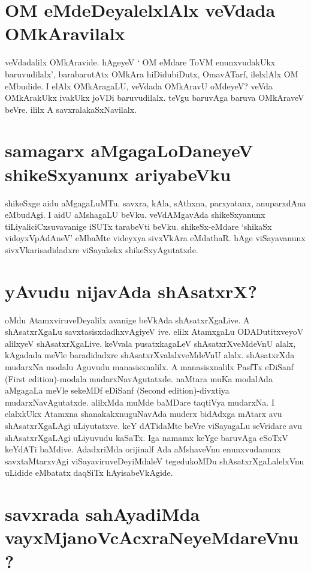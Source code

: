 \section*{OM eMdeDeyalelxlAlx veVdada OMkAravilalx}

veVdadalilx OMkAravide. hAgeyeV ` OM eMdare ToVM enunxvudakUkx baruvudilalx', barabarutAtx OMkAra hiDidubiDutx, OmavATarf, ilelxlAlx OM eMbudide. I elAlx OMkAragaLU, veVdada OMkAravU oMdeyeV? veVda OMkArakUkx ivakUkx joVDi baruvudilalx. teVgu baruvAga baruva OMkAraveV beVre. ililx A savxralakaSxNavilalx.

\section*{samagarx aMgagaLoDaneyeV shikeSxyanunx ariyabeVku}

shikeSxge aidu aMgagaLuMTu. savxra, kAla, sAthxna, parxyatanx, anuparxdAna eMbudAgi. I aidU aMshagaLU beVku. veVdAMgavAda shikeSxyanunx tiLiyaliciCxsuvavanige iSUTx tarabeVti beVku. shikeSx-eMdare `shikaSx vidoyxVpAdAneV' eMbaMte videyxya sivxVkAra eMdathaR. hAge viSayavanunx sivxVkarisadidadxre viSayakekx shikeSxyAgutatxde.

\section*{yAvudu nijavAda shAsatxrX?}

oMdu AtamxviruveDeyalilx avanige beVkAda shAsatxrXgaLive. A shAsatxrXgaLu savxtasisxdadhxvAgiyeV ive. elilx AtamxgaLu ODADutitxveyoV alilxyeV shAsatxrXgaLive. keVvala pusatxkagaLeV shAsatxrXveMdeVnU alalx, kAgadada meVle baradidadxre shAsatxrXvalalxveMdeVnU alalx. shAsatxrXda mudarxNa modalu Aguvudu manasisxnalilx. A manasisxnalilx PasfTx  eDiSanf {(\eng First edition)}-modala mudarxNavAgutatxde. naMtara muKa modalAda aMgagaLa meVle sekeMDf eDiSanf {(\eng Second edition)}-divxtiya mudarxNavAgutatxde. alilxMda muMde baMDare taqtiVya mudarxNa. I elalxkUkx Atamxna shanakakxnuguNavAda muderx bidAdxga mAtarx avu shAsatxrXgaLAgi uLiyutatxve. keY dATidaMte beVre viSayagaLu seVridare avu shAsatxrXgaLAgi uLiyuvudu kaSaTx. Iga namamx keYge baruvAga eSoTxV keYdATi baMdive. AdadxriMda orijinalf Ada aMshaveVnu enunxvudanunx savxtaMtarxvAgi viSayaviruveDeyiMdaleV tegedukoMDu shAsatxrXgaLalelxVnu uLidide eMbatatx daqSiTx hAyisabeVkAgide.

\section*{savxrada sahAyadiMda vayxMjanoVcAcxraNeyeMdareVnu?}

